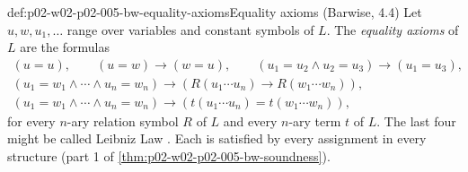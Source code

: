 \begin{hbdefinition}{def:p02-w02-p02-005-bw-equality-axioms}{Equality axioms (Barwise, 4.4)}
Let \(u,w,u_1,\ldots\) range over variables and constant symbols of \(L\).
The \emph{equality axioms} of \(L\) are the formulas
\[
\begin{gathered}
(u=u),\qquad (u=w)\to(w=u),\qquad (u_1=u_2\land u_2=u_3)\to(u_1=u_3),\\
(u_1=w_1\land\cdots\land u_n=w_n)\to(R(u_1\cdots u_n)\to R(w_1\cdots w_n)),\\
(u_1=w_1\land\cdots\land u_n=w_n)\to(t(u_1\cdots u_n)=t(w_1\cdots w_n)),
\end{gathered}
\]
for every \(n\)-ary relation symbol \(R\) of \(L\) and every \(n\)-ary term
\(t\) of \(L\).  The last four might be called Leibniz Law
\cite[ch.~A.1, \S4, 4.4, p.~29]{Barwise1977FirstOrder}.  Each is satisfied
by every assignment in every structure (part 1 of
\cref{thm:p02-w02-p02-005-bw-soundness}).
\end{hbdefinition}


